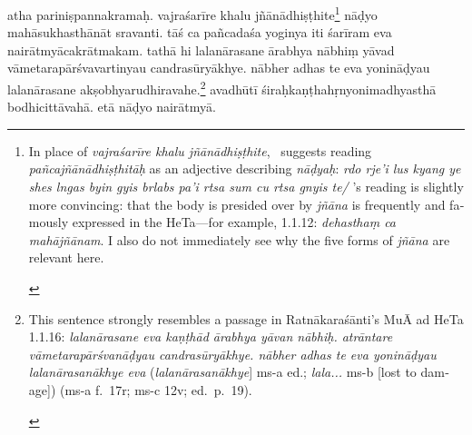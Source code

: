 \documentclass[naipra.tex]{subfiles}
\begin{document}
\begin{sanskrit}
\pstart
atha pariniṣpannakramaḥ.
vajraśarīre khalu jñānādhiṣṭhite\footnote{
	\begin{english}%
		In place of \emph{vajraśarīre khalu jñānādhiṣṭhite}, \TIB\ suggests reading \emph{pañcajñānādhiṣṭhitāḥ} as an adjective describing \emph{nāḍyaḥ}: \emph{rdo rje'i lus kyang ye shes lngas byin gyis brlabs pa'i rtsa sum cu rtsa gnyis te/} 
		\MSN 's reading is slightly more convincing: that the body is presided over by \emph{jñāna} is frequently and famously expressed in the HeTa—for example, 1.1.12: \emph{dehasthaṃ ca mahājñānam}.
		I also do not immediately see why the five forms of \emph{jñāna} are relevant here.
	\end{english}
}  nāḍyo mahāsukhasthānāt sravanti.
tāś ca pañcadaśa yoginya iti śarīram eva nairātmyācakrātmakam. 
tathā hi lalanārasane  ārabhya nābhiṃ yāvad vāmetarapārśvavartinyau candrasūryākhye.
nābher adhas te eva yonināḍyau lalanārasane akṣobhyarudhiravahe.\footnote{
	\begin{english}%
		This sentence strongly resembles a passage in Ratnākaraśānti's MuĀ ad HeTa 1.1.16:
		\emph{lalanārasane eva kaṇṭhād ārabhya yāvan nābhiḥ.
		atrāntare vāmetarapārśvanāḍyau candrasūryākhye.
		nābher adhas te eva yonināḍyau lalanārasanākhye eva} (\emph{lalanārasanākhye}] ms-a ed.; \emph{lala...} ms-b [lost to damage]) (ms-a f.\ 17r; ms-c 12v; ed.\ p.\ 19).
	\end{english}
}
avadhūtī śiraḥkaṇṭhahṛnyonimadhyasthā bodhicittāvahā.
etā nāḍyo nairātmyā. 
\pend




\end{sanskrit}
\end{document}

